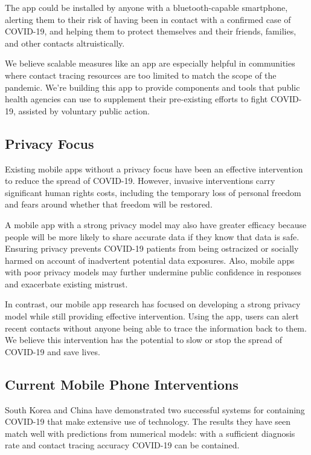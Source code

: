 \documentclass[11pt]{article}
\begin{document}
The app could be installed by anyone with a bluetooth-capable smartphone, alerting them to their risk of having been in contact with a confirmed case of COVID-19, and helping them to protect themselves and their friends, families, and other contacts altruistically.

We believe scalable measures like an app are especially helpful in communities where contact tracing resources are too limited to match the scope of the pandemic. We're building this app to provide components and tools that public health agencies can use to supplement their pre-existing efforts to fight COVID-19, assisted by voluntary public action. 


\subsection{Privacy Focus}

Existing mobile apps without a privacy focus have been an effective intervention to reduce the spread of COVID-19. However, invasive interventions carry significant human rights costs, including the temporary loss of personal freedom and fears around whether that freedom will be restored.

A mobile app with a strong privacy model may also have greater efficacy because people will be more likely to share accurate data if they know that data is safe. Ensuring privacy prevents COVID-19 patients from being ostracized or socially harmed on account of inadvertent potential data exposures. Also, mobile apps with poor privacy models may further undermine public confidence in responses and exacerbate existing mistrust. 

In contrast, our mobile app research has focused on developing a strong privacy model while still providing effective intervention. Using the app, users can alert recent contacts without anyone being able to trace the information back to them. We believe this intervention has the potential to slow or stop the spread of COVID-19 and save lives. 

\subsection{Current Mobile Phone Interventions}


South Korea and China have demonstrated two successful systems for containing COVID-19 that make extensive use of technology. The results they have seen match well with predictions from numerical models: with a sufficient diagnosis rate and contact tracing accuracy COVID-19 can be contained.
\end{document}
